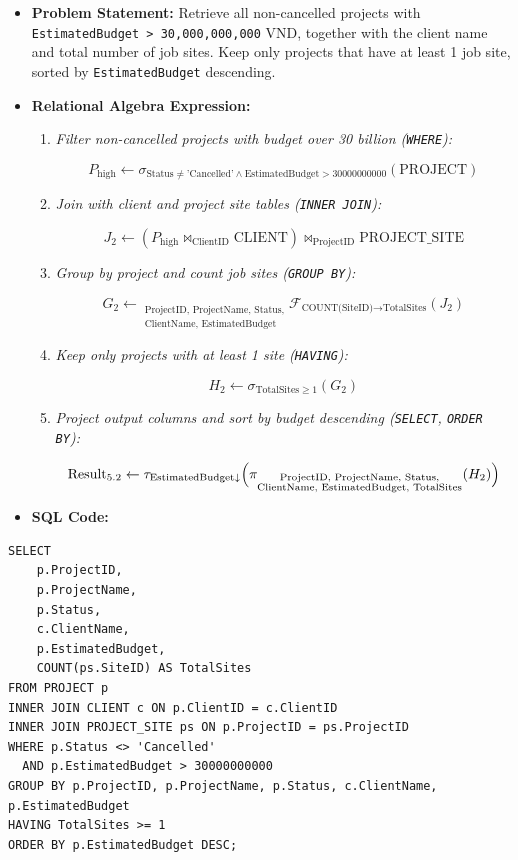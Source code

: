 \documentclass[a4paper,12pt]{report}
\begin{document}
\begin{itemize}
\item
  \textbf{Problem Statement:} Retrieve all non-cancelled projects with \texttt{EstimatedBudget \textgreater{} 30,000,000,000} VND, together with the client name and total number of job sites. Keep only projects that have at least 1 job site, sorted by \texttt{EstimatedBudget} descending.
\item
  \textbf{Relational Algebra Expression:}

  \begin{enumerate}
  \def\labelenumi{\arabic{enumi}.}
  \item
    \emph{Filter non-cancelled projects with budget over 30 billion (\texttt{WHERE}):}

    \[P_{\text{high}} \leftarrow \sigma_{\text{Status} \neq \text{'Cancelled'} \land \text{EstimatedBudget} > 30000000000}(\text{PROJECT})\]
  \item
    \emph{Join with client and project site tables (\texttt{INNER JOIN}):}

    \[J_{2} \leftarrow (P_{\text{high}} \bowtie_{\text{ClientID}} \text{CLIENT}) \bowtie_{\text{ProjectID}} \text{PROJECT\_SITE}\]
  \item
    \emph{Group by project and count job sites (\texttt{GROUP BY}):}

    \[G_{2} \leftarrow {}_{\substack{\text{ProjectID, ProjectName, Status,} \\ \text{ClientName, EstimatedBudget}}}\mathcal{F}_{\text{COUNT(SiteID)} \rightarrow \text{TotalSites}}(J_{2})\]
  \item
    \emph{Keep only projects with at least 1 site (\texttt{HAVING}):}

    \[H_{2} \leftarrow \sigma_{\text{TotalSites} \geq 1}(G_{2})\]
  \item
    \emph{Project output columns and sort by budget descending (\texttt{SELECT}, \texttt{ORDER BY}):}

    \[\text{Result}_{5.2} \leftarrow \tau_{\text{EstimatedBudget} \downarrow}\Bigl(\pi_{\substack{\text{ProjectID, ProjectName, Status,} \\ \text{ClientName, EstimatedBudget, TotalSites}}}(H_{2})\Bigr)\]
  \end{enumerate}
\item
  \textbf{SQL Code:}
\end{itemize}

\begin{lstlisting}
SELECT 
    p.ProjectID,
    p.ProjectName,
    p.Status,
    c.ClientName,
    p.EstimatedBudget,
    COUNT(ps.SiteID) AS TotalSites
FROM PROJECT p
INNER JOIN CLIENT c ON p.ClientID = c.ClientID
INNER JOIN PROJECT_SITE ps ON p.ProjectID = ps.ProjectID
WHERE p.Status <> 'Cancelled'
  AND p.EstimatedBudget > 30000000000
GROUP BY p.ProjectID, p.ProjectName, p.Status, c.ClientName, p.EstimatedBudget
HAVING TotalSites >= 1
ORDER BY p.EstimatedBudget DESC;
\end{lstlisting}
\end{document}
